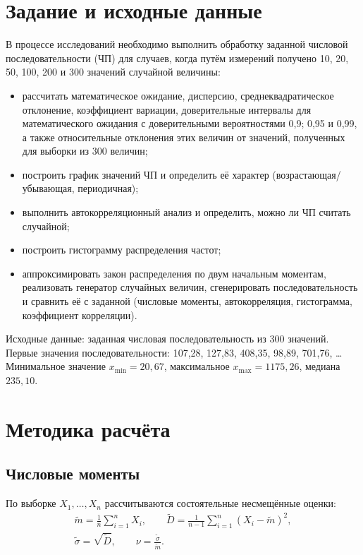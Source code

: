 \documentclass[a4paper,12pt]{article}
\begin{document}
\section{Задание и исходные данные}
В процессе исследований необходимо выполнить обработку заданной числовой последовательности (ЧП) для случаев, когда путём измерений получено 10, 20, 50, 100, 200 и 300 значений случайной величины:
\begin{itemize}
  \item рассчитать математическое ожидание, дисперсию, среднеквадратическое отклонение, коэффициент вариации, доверительные интервалы для математического ожидания с доверительными вероятностями 0,9; 0,95 и 0,99, а также относительные отклонения этих величин от значений, полученных для выборки из 300 величин;
  \item построить график значений ЧП и определить её характер (возрастающая/убывающая, периодичная);
  \item выполнить автокорреляционный анализ и определить, можно ли ЧП считать случайной;
  \item построить гистограмму распределения частот;
  \item аппроксимировать закон распределения по двум начальным моментам, реализовать генератор случайных величин, сгенерировать последовательность и сравнить её с заданной (числовые моменты, автокорреляция, гистограмма, коэффициент корреляции).
\end{itemize}

Исходные данные: заданная числовая последовательность из 300 значений. Первые значения последовательности: 107{,}28, 127{,}83, 408{,}35, 98{,}89, 701{,}76, \ldots{} Минимальное значение $x_{\min}=20{,}67$, максимальное $x_{\max}=1175{,}26$, медиана $235{,}10$.

\section{Методика расчёта}
\subsection{Числовые моменты}
По выборке $X_1,\dots,X_n$ рассчитываются состоятельные несмещённые оценки:
\begin{gather}
\tilde m=\frac{1}{n}\sum_{i=1}^{n}X_i,\qquad
\tilde D=\frac{1}{n-1}\sum_{i=1}^{n}\left(X_i-\tilde m\right)^2,\\
\tilde\sigma=\sqrt{\tilde D},\qquad \nu=\frac{\tilde\sigma}{\tilde m}.
\end{gather}
\end{document}

